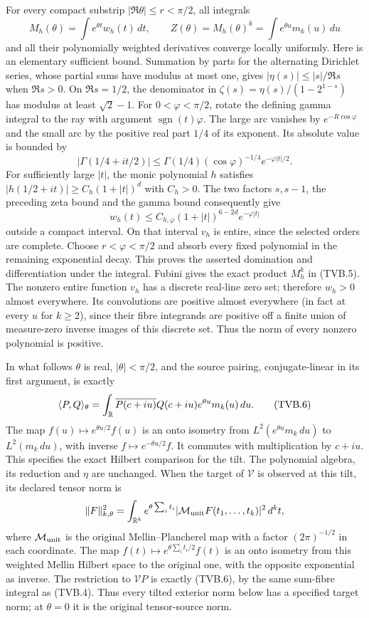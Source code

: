 For every compact substrip $|\Re\theta|\le r<\pi/2$, all integrals
\[
 M_h(\theta)=\int e^{\theta t}w_h(t)\,dt,\qquad
 Z(\theta)=M_h(\theta)^k=\int e^{\theta u}m_k(u)\,du
 \tag{TVB.5}
\]
and all their polynomially weighted derivatives converge locally
uniformly. Here is an elementary sufficient bound. Summation by parts
for the alternating Dirichlet series, whose partial sums have modulus
at most one, gives $|\eta(s)|\le |s|/\Re s$ when $\Re s>0$.
On $\Re s=1/2$, the denominator in
$\zeta(s)=\eta(s)/(1-2^{1-s})$ has modulus at least $\sqrt2-1$.
For $0<\varphi<\pi/2$, rotate the defining gamma integral to the
ray with argument $\operatorname{sgn}(t)\varphi$. The large arc
vanishes by $e^{-R\cos\varphi}$ and the small arc by the positive
real part $1/4$ of its exponent. Its absolute value is bounded by
\[
 |\Gamma(1/4+it/2)|
 \le\Gamma(1/4)(\cos\varphi)^{-1/4}e^{-\varphi|t|/2}.
\]
For sufficiently large $|t|$, the monic polynomial $h$ satisfies
$|h(1/2+it)|\ge C_h(1+|t|)^d$ with $C_h>0$.
The two factors $s,s-1$, the preceding zeta bound and the gamma
bound consequently give
\[
 w_h(t)\le C_{h,\varphi}(1+|t|)^{6-2d}e^{-\varphi|t|}
\]
outside a compact interval. On that interval $v_h$ is entire, since
the selected orders are complete. Choose $r<\varphi<\pi/2$ and
absorb every fixed polynomial in the remaining exponential decay.
This proves the asserted domination and differentiation under the
integral. Fubini gives the exact product $M_h^k$ in (TVB.5).
The nonzero entire function $v_h$ has a discrete real-line zero set;
therefore $w_h>0$ almost everywhere. Its convolutions are positive
almost everywhere (in fact at every $u$ for $k\ge2$), since their
fibre integrands are positive off a finite union of measure-zero
inverse images of this discrete set. Thus the norm of every nonzero
polynomial is positive.

In what follows $\theta$ is real, $|\theta|<\pi/2$, and the source
pairing, conjugate-linear in its first argument, is exactly
\[
 \langle P,Q\rangle_\theta
 =\int_\mathbb R\overline{P(c+iu)}Q(c+iu)e^{\theta u}m_k(u)\,du.
 \tag{TVB.6}
\]
The map $f(u)\mapsto e^{\theta u/2}f(u)$ is an onto isometry from
$L^2(e^{\theta u}m_k\,du)$ to $L^2(m_k\,du)$, with inverse
$f\mapsto e^{-\theta u/2}f$. It commutes with multiplication by
$c+iu$. This specifies the exact Hilbert comparison for the tilt.
The polynomial algebra, its reduction and $\eta$ are unchanged.
When the target of $\mathcal V$ is observed at this tilt, its declared
tensor norm is
\[
 \|F\|_{k,\theta}^2=\int_{\mathbb R^k}
 e^{\theta\sum_i t_i}|\mathcal M_{\rm unit}F(t_1,\ldots,t_k)|^2\,d^kt,
\]
where $\mathcal M_{\rm unit}$ is the original Mellin--Plancherel map
with a factor $(2\pi)^{-1/2}$ in each coordinate. The map
$f(t)\mapsto e^{\theta\sum_i t_i/2}f(t)$ is an onto isometry from
this weighted Mellin Hilbert space to the original one, with the
opposite exponential as inverse. The restriction to $\mathcal V P$
is exactly (TVB.6), by the same sum-fibre integral as (TVB.4).
Thus every tilted exterior norm below has a specified target norm;
at $\theta=0$ it is the original tensor-source norm.

